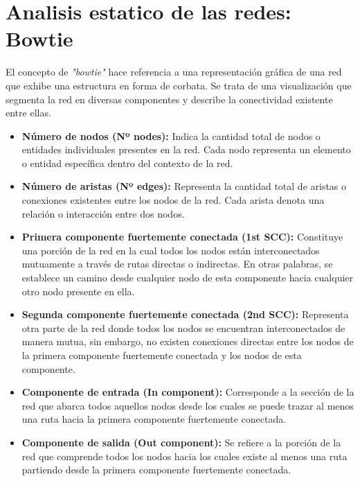 
\section {Analisis estatico de las redes: Bowtie}

El concepto de \textit{"bowtie"} hace referencia a una representación gráfica de una red
que exhibe una estructura en forma de corbata. Se trata de una visualización que segmenta
la red en diversas componentes y describe la conectividad existente entre ellas.

\begin{itemize}
    \item \textbf{Número de nodos (Nº nodes):} Indica la cantidad total de nodos o entidades individuales presentes en la red. Cada nodo representa un elemento o entidad específica dentro del contexto de la red.

    \item \textbf{Número de aristas (Nº edges):} Representa la cantidad total de aristas o conexiones existentes entre los nodos de la red. Cada arista denota una relación o interacción entre dos nodos.

    \item \textbf{Primera componente fuertemente conectada (1st SCC):} Constituye una porción de la red en la cual todos los nodos están interconectados mutuamente a través de rutas directas o indirectas. En otras palabras, se establece un camino desde cualquier nodo de esta componente hacia cualquier otro nodo presente en ella.

    \item \textbf{Segunda componente fuertemente conectada (2nd SCC):} Representa otra parte de la red donde todos los nodos se encuentran interconectados de manera mutua, sin embargo, no existen conexiones directas entre los nodos de la primera componente fuertemente conectada y los nodos de esta componente.

    \item \textbf{Componente de entrada (In component):} Corresponde a la sección de la red que abarca todos aquellos nodos desde los cuales se puede trazar al menos una ruta hacia la primera componente fuertemente conectada.

    \item \textbf{Componente de salida (Out component):} Se refiere a la porción de la red que comprende todos los nodos hacia los cuales existe al menos una ruta partiendo desde la primera componente fuertemente conectada.


\end{itemize}
